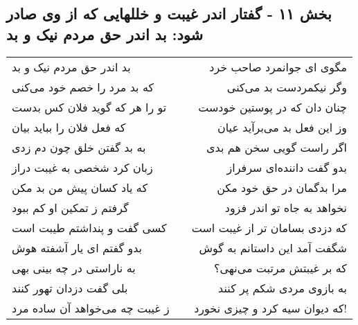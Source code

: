 \begin{center}
\section*{بخش ۱۱ - گفتار اندر غیبت و خللهایی که از وی صادر شود: بد اندر حق مردم نیک و بد}
\label{sec:011}
\begin{longtable}{l p{0.5cm} r}
بد اندر حق مردم نیک و بد
&&
مگوی ای جوانمرد صاحب خرد
\\
که بد مرد را خصم خود می‌کنی
&&
وگر نیکمردست بد می‌کنی
\\
تو را هر که گوید فلان کس بدست
&&
چنان دان که در پوستین خودست
\\
که فعل فلان را بباید بیان
&&
وز این فعل بد می‌برآید عیان
\\
به بد گفتن خلق چون دم زدی
&&
اگر راست گویی سخن هم بدی
\\
زبان کرد شخصی به غیبت دراز
&&
بدو گفت داننده‌ای سرفراز
\\
که یاد کسان پیش من بد مکن
&&
مرا بدگمان در حق خود مکن
\\
گرفتم ز تمکین او کم ببود
&&
نخواهد به جاه تو اندر فزود
\\
کسی گفت و پنداشتم طیبت است
&&
که دزدی بسامان تر از غیبت است
\\
بدو گفتم ای یار آشفته هوش
&&
شگفت آمد این داستانم به گوش
\\
به ناراستی در چه بینی بهی
&&
که بر غیبتش مرتبت می‌نهی؟
\\
بلی گفت دزدان تهور کنند
&&
به بازوی مردی شکم پر کنند
\\
ز غیبت چه می‌خواهد آن ساده مرد
&&
که دیوان سیه کرد و چیزی نخورد!
\\
\end{longtable}
\end{center}
